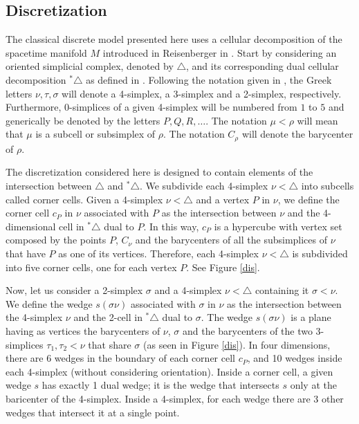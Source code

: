\documentclass{article}
\begin{document}
\subsection{Discretization}
\label{discretization}


The classical discrete model presented here uses a cellular decomposition of the spacetime manifold $M$ introduced in Reisenberger in \cite{Rei1}. Start by considering an oriented simplicial complex, denoted by $\triangle$, and its corresponding dual cellular decomposition $^{*}\triangle$ as defined in \cite{Thi}. Following the notation given in \cite{Rei1}, the Greek letters $\nu, \tau, \sigma$ will denote a 4-simplex, a 3-simplex and a 2-simplex, respectively. Furthermore, 0-simplices of a given 4-simplex will be numbered from $1$ to $5$ and generically be denoted by the letters $P,Q,R,\dots$. The notation $\mu<\rho$ will mean that $\mu$ is a subcell or subsimplex of $\rho$. The notation $C_{\rho}$ will denote the barycenter of $\rho$. 

The discretization considered here is designed to contain elements of the intersection between $\triangle$ and $^{*}\triangle$. We subdivide each 4-simplex $\nu<\triangle$ into subcells called corner cells. Given a 4-simplex $\nu<\triangle$ and a vertex $P$ in $\nu$, we define the corner cell $c_{P}$ in $\nu$ associated with $P$ as the intersection between $\nu$ and the 4-dimensional cell in $^{*}\triangle$ dual to $P$. In this way, $c_{P}$ is a hypercube with vertex set composed by the points $P$, $C_{\nu}$ and the barycenters of all the subsimplices of $\nu$ that have $P$ as one of its vertices. Therefore, each 4-simplex $\nu<\triangle$ is subdivided into five corner cells, one for each vertex $P$. See Figure \ref{dis}.

Now, let us consider a 2-simplex $\sigma$ and a 4-simplex $\nu<\triangle$ containing it $\sigma<\nu$. We define the wedge $s(\sigma\nu)$ associated with $\sigma$ in $\nu$ as the intersection between the 4-simplex $\nu$ and the 2-cell in $^{*}\triangle$ dual to $\sigma$. The wedge $s(\sigma\nu)$ is a plane having as vertices the barycenters of $\nu$, $\sigma$ and the barycenters of the two 3-simplices $\tau_1,\tau_2<\nu$ that share $\sigma$ (as seen in Figure \ref{dis}). In four dimensions, there are 6 wedges in the boundary of each corner cell $c_{P}$, and 10 wedges inside each 4-simplex (without considering orientation). Inside a corner cell, a given wedge $s$ has exactly 1 dual wedge; it is the wedge that intersects $s$ only at the baricenter of the 4-simplex. Inside a 4-simplex, for each wedge there are 3 other wedges that intersect it at a single point. 
\end{document}
